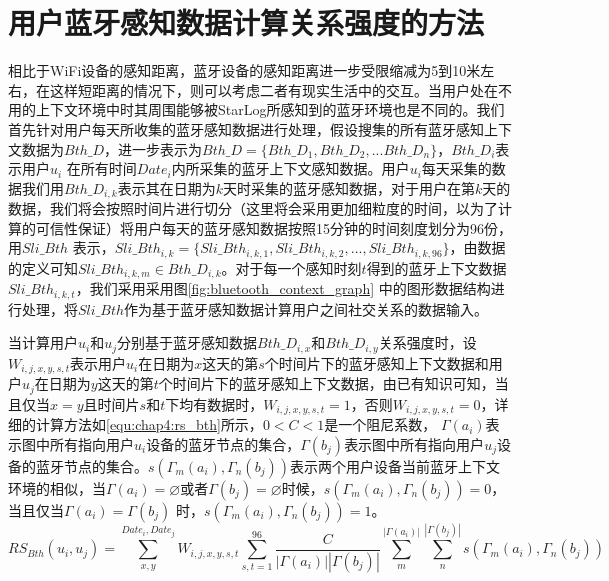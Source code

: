 \section{用户蓝牙感知数据计算关系强度的方法}
\label{sec:bl_input}
相比于WiFi设备的感知距离，蓝牙设备的感知距离进一步受限缩减为5到10米左右，在这样短距离的情况下，则可以考虑二者有现实生活中的交互。当用户处在不用的上下文环境中时其周围能够被StarLog所感知到的蓝牙环境也是不同的。我们首先针对用户每天所收集的蓝牙感知数据进行处理，假设搜集的所有蓝牙感知上下文数据为$Bth\_D$，进一步表示为$Bth\_D=\{Bth\_D_{1},Bth\_D_{2},...Bth\_D_{n} \}$，$Bth\_D_{i}$表示用户$u_{i}$ 在所有时间$Date_{i}$内所采集的蓝牙上下文感知数据。用户$u_{i}$每天采集的数据我们用$Bth\_D_{i,k}$表示其在日期为$k$天时采集的蓝牙感知数据，对于用户在第$k$天的数据，我们将会按照时间片进行切分（这里将会采用更加细粒度的时间，以为了计算的可信性保证）将用户每天的蓝牙感知数据按照15分钟的时间刻度划分为96份，用$Sli\_Bth$ 表示，$Sli\_Bth_{i,k}=\{Sli\_Bth_{i,k,1},Sli\_Bth_{i,k,2},...,Sli\_Bth_{i,k,96}\}$，由数据的定义可知$Sli\_Bth_{i,k,m} \in Bth\_D_{i,k}$。对于每一个感知时刻$t$得到的蓝牙上下文数据$Sli\_Bth_{i,k,t}$，我们采用采用图\ref{fig:bluetooth_context_graph} 中的图形数据结构进行处理，将$Sli\_Bth$作为基于蓝牙感知数据计算用户之间社交关系的数据输入。

\par 当计算用户$u_{i}$和$u_{j}$分别基于蓝牙感知数据$Bth\_D_{i,x}$和$Bth\_D_{i,y}$关系强度时，设$W_{i,j,x,y,s,t}$表示用户$u_{i}$在日期为$x$这天的第$s$个时间片下的蓝牙感知上下文数据和用户$u_{j}$在日期为$y$这天的第$t$个时间片下的蓝牙感知上下文数据，由已有知识可知，当且仅当$x=y$且时间片$s$和$t$下均有数据时，$W_{i,j,x,y,s,t}=1$，否则$W_{i,j,x,y,s,t}=0$，详细的计算方法如\ref{equ:chap4:rs_bth}所示，$0< C<1$是一个阻尼系数， $\Gamma (a_{i}) $表示图中所有指向用户$u_{i}$设备的蓝牙节点的集合，$\Gamma (b_{j}) $表示图中所有指向用户$u_{j}$设备的蓝牙节点的集合。$s(\Gamma_{m} (a_{i}),\Gamma_{n} (b_{j}))$表示两个用户设备当前蓝牙上下文环境的相似，当$\Gamma (a_{i})= \varnothing $或者$\Gamma (b_{j})=\varnothing $时候，$s(\Gamma_{m} (a_{i}),\Gamma_{n} (b_{j}))=0$，当且仅当$\Gamma (a_{i})=\Gamma (b_{j})$ 时，$s(\Gamma_{m} (a_{i}),\Gamma_{n} (b_{j}))=1$。
\begin{equation}
\label{equ:chap4:rs_bth}
RS_{Bth}(u_{i},u_{j})=\sum_{x ,y }^{ Date_{i}, Date_{j}}W_{i,j,x,y,s,t}\sum_{s,t=1}^{96} \frac{C}{ \left |\Gamma (a_{i})  \right |\left |\Gamma (b_{j})  \right | } \sum_{m}^{\left |\Gamma (a_{i})  \right |}  \sum_{n}^{\left |\Gamma (b_{j})  \right |}s(\Gamma_{m} (a_{i}),\Gamma_{n} (b_{j}))
\end{equation}

